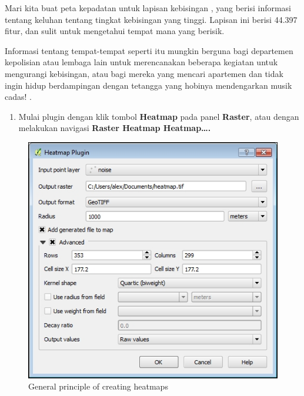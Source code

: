 \documentclass[]{book}
\providecommand{\tightlist}{%
  \setlength{\itemsep}{0pt}\setlength{\parskip}{0pt}}
\begin{document}
Mari kita buat peta kepadatan untuk lapisan kebisingan , yang berisi informasi tentang keluhan tentang tingkat kebisingan yang tinggi. Lapisan ini berisi 44.397 fitur, dan sulit untuk mengetahui tempat mana yang berisik.

Informasi tentang tempat-tempat seperti itu mungkin berguna bagi departemen kepolisian atau lembaga lain untuk merencanakan beberapa kegiatan untuk mengurangi kebisingan, atau bagi mereka yang mencari apartemen dan tidak ingin hidup berdampingan dengan tetangga yang hobinya mendengarkan musik cadas! .

\begin{enumerate}
\def\labelenumi{\arabic{enumi}.}
\tightlist
\item
  Mulai plugin dengan klik tombol \textbf{Heatmap} pada panel \textbf{Raster}, atau dengan melakukan navigasi \textbf{Raster \textbar{} Heatmap \textbar{} Heatmap\ldots{}.}
\end{enumerate}

\begin{figure}

{\centering \includegraphics[width=0.7\linewidth]{images/04/fig7} 

}

\caption{General principle of creating heatmaps}\label{fig:fig1409}
\end{figure}
\end{document}
